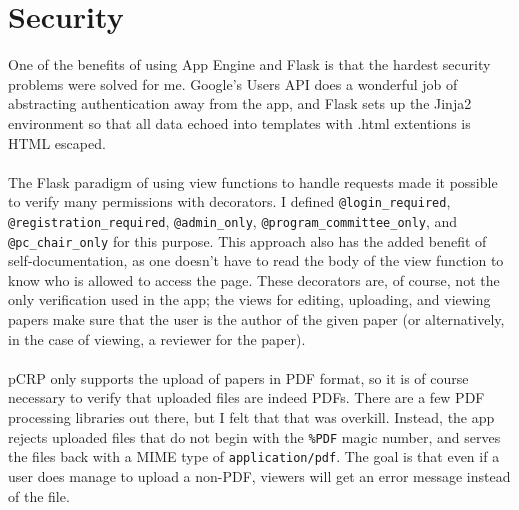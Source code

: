 \documentclass[12pt]{article}
\begin{document}
\section{Security}
	One of the benefits of using App Engine and Flask is that the hardest
	security problems were solved for me. Google's Users API does a
	wonderful job of abstracting authentication away from the app, and
	Flask sets up the Jinja2 environment so that all data echoed into
	templates with .html extentions is HTML escaped.
	\\\\
	The Flask paradigm of using view functions to handle requests made
	it possible to verify many permissions with decorators. I defined
	\texttt{@login\_required}, \texttt{@registration\_required},
	\texttt{@admin\_only}, \texttt{@program\_committee\_only}, and
	\texttt{@pc\_chair\_only} for this purpose. This approach also
	has the added benefit of self-documentation, as one doesn't have
	to read the body of the view function to know who is allowed to
	access the page. These decorators are, of course, not the only
	verification used in the app; the views for editing, uploading, and
	viewing papers make sure that the user is the author of the given paper
	(or alternatively, in the case of viewing, a reviewer for the paper).
	\\\\
	pCRP only supports the upload of papers in PDF format, so it is of
	course necessary to verify that uploaded files are indeed PDFs. There
	are a few PDF processing libraries out there, but I felt that that was
	overkill. Instead, the app rejects uploaded files that do not begin with
	the \texttt{\%PDF} magic number, and serves the files back with a MIME
	type of \texttt{application/pdf}. The goal is that even if a user does
	manage to upload a non-PDF, viewers will get an error message instead of
	the file.



\end{document}
